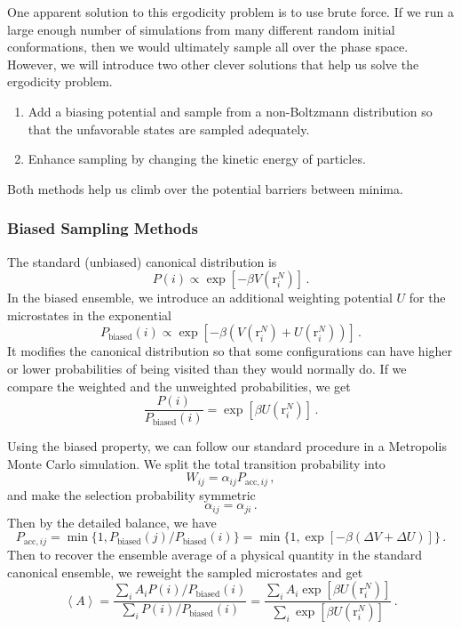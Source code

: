 \documentclass{article}
\theoremstyle{plain}\theoremheaderfont{\normalfont\itshape}\theorembodyfont{\rmfamily}\theoremseparator{.}\newtheorem*{rem}{Remark}\newtheorem*{ex}{Example}\newtheorem*{proof}{Proof}\newtheorem*{altp}{Alternative proof}
\theoremstyle{plain}\theoremheaderfont{\normalfont\bfseries}\theorembodyfont{\rmfamily}\theoremseparator{.}\newtheorem{thm}{Theorem}[section]\newtheorem{lem}[thm]{Lemma}\newtheorem{prop}[thm]{Proposition}\newtheorem*{cor}{Corollary}\newtheorem{defn}[thm]{Definition}\newtheorem{clm}[thm]{Claim}\newtheorem{clminproof}{Claim}\newtheorem{alg}[thm]{Algorithm}\newtheorem{hyp}[thm]{Hypothesis}\newtheorem{law}[thm]{Law}
\theoremstyle{break}\theoremheaderfont{\normalfont\itshape}\theorembodyfont{\rmfamily}\theoremseparator{.\medskip}\newtheorem*{proofskip}{Proof}\newtheorem*{exs}{Examples}\newtheorem*{rems}{Remarks}
\theoremstyle{break}\theoremheaderfont{\normalfont\bfseries}\theorembodyfont{\rmfamily}\theoremseparator{.\medskip}\newtheorem{lemskip}[thm]{Lemma}\newtheorem{defnskip}[thm]{Definition}\newtheorem{propskip}[thm]{Proposition}\newtheorem{thmskip}[thm]{Theorem}
\numberwithin{equation}{section}
\newcommand{\eval}[1]{\left\langle #1 \right\rangle}
\newcommand{\vb}[1]{\bm{\mathrm{#1}}}
\begin{document}
    One apparent solution to this ergodicity problem is to use brute force. If we run a large enough number of simulations from many different random initial conformations, then we would ultimately sample all over the phase space. However, we will introduce two other clever solutions that help us solve the ergodicity problem.
    \begin{enumerate}[topsep=0pt]
        \item Add a biasing potential and sample from a non-Boltzmann distribution so that the unfavorable states are sampled adequately.
        \item Enhance sampling by changing the kinetic energy of particles.
    \end{enumerate}
    Both methods help us climb over the potential barriers between minima.

    \subsubsection{Biased Sampling Methods}
    The standard (unbiased) canonical distribution is
    \begin{equation}
        P(i)\propto \exp[-\beta V(\vb{r}_i^N)]\,.
    \end{equation}
    In the biased ensemble, we introduce an additional weighting potential \(U\) for the microstates in the exponential
    \begin{equation}
        P_{\text{biased}}(i)\propto\exp[-\beta (V(\vb{r}_i^N)+U(\vb{r}_i^N))]\,.
    \end{equation}
    It modifies the canonical distribution so that some configurations can have higher or lower probabilities of being visited than they would normally do. If we compare the weighted and the unweighted probabilities, we get
    \begin{equation}
        \frac{P(i)}{P_{\text{biased}}(i)}=\exp[\beta U(\vb{r}_i^N)]\,.
    \end{equation}

    Using the biased property, we can follow our standard procedure in a Metropolis Monte Carlo simulation. We split the total transition probability into
    \begin{equation}
        W_{ij}=\alpha_{ij}P_{\text{acc}, ij}\,,
    \end{equation}
    and make the selection probability symmetric
    \begin{equation}
        \alpha_{ij}=\alpha_{ji}\,.
    \end{equation}
    Then by the detailed balance, we have
    \begin{equation}
        P_{\text{acc}, ij}=\min\{1,P_{\text{biased}}(j)/P_{\text{biased}}(i)\}=\min\{1,\exp[-\beta(\Delta V+\Delta U)]\}\,.
    \end{equation}
    Then to recover the ensemble average of a physical quantity in the standard canonical ensemble, we reweight the sampled microstates and get
    \begin{equation}
        \eval{A}=\frac{\sum_i A_i P(i)/P_{\text{biased}}(i)}{\sum_i P(i)/P_{\text{biased}}(i)}=\frac{\sum_i A_i\exp[\beta U(\vb{r}_i^N)]}{\sum_i\exp[\beta U(\vb{r}_i^N)]}\,.
    \end{equation}
\end{document}

